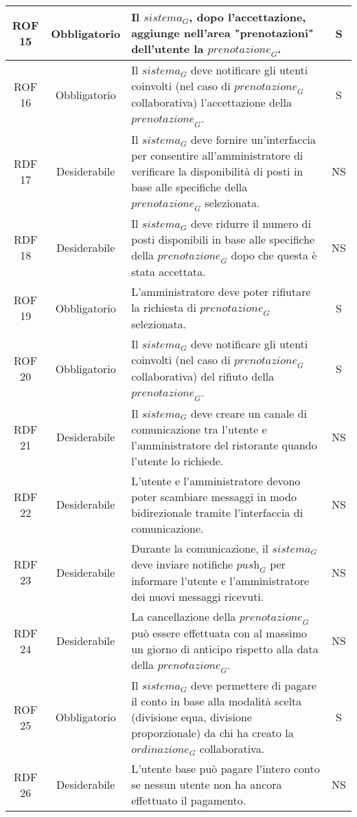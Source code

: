 \begin{longtable}{|c|c|p{12cm}|c|}
\hline
ROF 15& Obbligatorio & Il $\textit{sistema}_G$, dopo l'accettazione, aggiunge nell'area "prenotazioni" dell'utente la $\textit{prenotazione}_G$. & S\\
\hline
ROF 16& Obbligatorio & Il $\textit{sistema}_G$ deve notificare gli utenti coinvolti (nel caso di $\textit{prenotazione}_G$ collaborativa) l'accettazione della $\textit{prenotazione}_G$. & S\\
\hline
RDF 17&  Desiderabile & Il $\textit{sistema}_G$ deve fornire un'interfaccia per consentire all'amministratore di verificare la disponibilità di posti in base alle specifiche della $\textit{prenotazione}_G$ selezionata. & NS\\
\hline
RDF 18& Desiderabile &Il $\textit{sistema}_G$ deve ridurre il numero di posti disponibili in base alle specifiche della $\textit{prenotazione}_G$ dopo che questa è stata accettata. & NS\\
\hline
ROF 19& Obbligatorio &L'amministratore deve poter rifiutare la richiesta di $\textit{prenotazione}_G$ selezionata. & S\\
\hline
ROF 20& Obbligatorio &Il $\textit{sistema}_G$ deve notificare gli utenti coinvolti (nel caso di $\textit{prenotazione}_G$ collaborativa) del rifiuto della $\textit{prenotazione}_G$. & S\\
\hline
RDF 21& Desiderabile &Il $\textit{sistema}_G$ deve creare un canale di comunicazione tra l'utente e l'amministratore del ristorante quando l'utente lo richiede. & NS\\
\hline
RDF 22&  Desiderabile &L'utente e l'amministratore devono poter scambiare messaggi in modo bidirezionale tramite l'interfaccia di comunicazione. & NS\\
\hline
RDF 23&  Desiderabile &Durante la comunicazione, il $\textit{sistema}_G$ deve inviare notifiche $\textit{push}_G$ per informare l'utente e l'amministratore dei nuovi messaggi ricevuti. & NS\\
\hline
RDF 24& Desiderabile & La cancellazione della $\textit{prenotazione}_G$ può essere effettuata con al massimo un giorno di anticipo rispetto alla data della $\textit{prenotazione}_G$.  & NS\\ 
\hline
ROF 25&  Obbligatorio & Il $\textit{sistema}_G$ deve permettere di pagare il conto in base alla modalità scelta (divisione equa, divisione proporzionale) da chi ha creato la $\textit{ordinazione}_G$ collaborativa. & S\\
\hline
RDF 26& Desiderabile & L'utente base può pagare l'intero conto se nessun utente non ha ancora effettuato il pagamento. & NS\\

\end{longtable}
